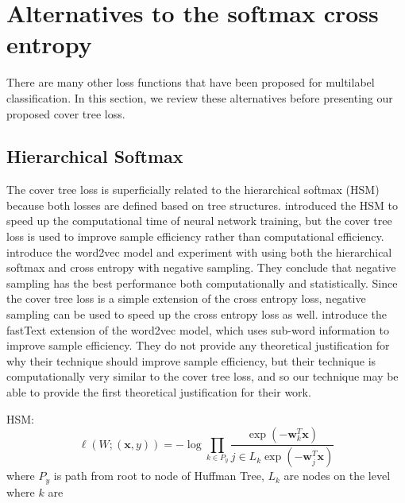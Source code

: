 \documentclass[twoside]{article}
\theoremstyle{definition}
\newcommand{\trans}[1]{{#1}^{T}}
\newcommand{\w}{\mathbf w}
\newcommand{\x}{\mathbf x}
\newcommand{\fixme}[1]{\noindent{\color{red}\textbf{FIXME:}  {#1}}}
\begin{document}
\section{Alternatives to the softmax cross entropy}

There are many other loss functions that have been proposed for multilabel classification.
In this section, we review these alternatives before presenting our proposed cover tree loss.

\subsection{Hierarchical Softmax}

The cover tree loss is superficially related to the hierarchical softmax (HSM) because both losses are defined based on tree structures.
\cite{morin2005hierarchical} introduced the HSM to speed up the computational time of neural network training,
but the cover tree loss is used to improve sample efficiency rather than computational efficiency.
\cite{mikolov2013distributed} introduce the word2vec model and experiment with using both the hierarchical softmax and cross entropy with negative sampling.
They conclude that negative sampling has the best performance both computationally and statistically.
Since the cover tree loss is a simple extension of the cross entropy loss,
negative sampling can be used to speed up the cross entropy loss as well.
\cite{bojanowski2017enriching} introduce the fastText extension of the word2vec model, which uses sub-word information to improve sample efficiency.
They do not provide any theoretical justification for why their technique should improve sample efficiency,
but their technique is computationally very similar to the cover tree loss,
and so our technique may be able to provide the first theoretical justification for their work.

HSM:
\begin{equation}
    \label{eq:xentropy}
    \ell(W;(\x,y)) = - \log \prod_{k\in P_y}\frac {\exp(-\trans\w_k \x)}{j\in L_k \exp(-\trans \w_j \x)}
\end{equation}
where $P_y$ is path from root to node of Huffman Tree,
$L_k$ are nodes on the level where $k$ are



\end{document}
